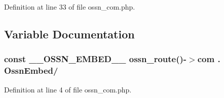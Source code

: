 Definition at line 33 of file ossn\+\_\+com.\+php.



\subsection{Variable Documentation}
\subsubsection[{\texorpdfstring{\+\_\+\+\_\+\+O\+S\+S\+N\+\_\+\+E\+M\+B\+E\+D\+\_\+\+\_\+}{__OSSN_EMBED__}}]{\setlength{\rightskip}{0pt plus 5cm}const \+\_\+\+\_\+\+O\+S\+S\+N\+\_\+\+E\+M\+B\+E\+D\+\_\+\+\_\+ {\bf ossn\+\_\+route}()-\/$>$com . \textquotesingle{}Ossn\+Embed/\textquotesingle{}}\hypertarget{_ossn_embed_2ossn__com_8php_a664c516ed39b8c5ff0bad3076a0a3662}{}\label{_ossn_embed_2ossn__com_8php_a664c516ed39b8c5ff0bad3076a0a3662}


Definition at line 4 of file ossn\+\_\+com.\+php.

